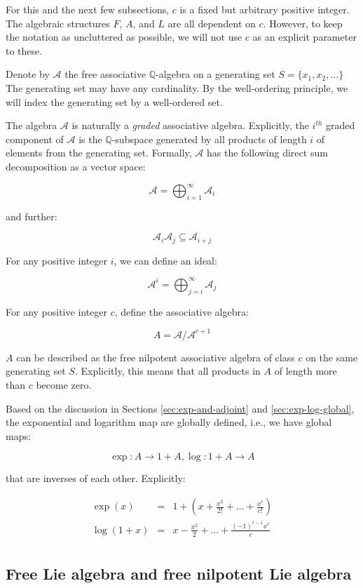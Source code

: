 \documentclass{ucetd}
\begin{document}
For this and the next few subsections, $c$ is a fixed but arbitrary
positive integer. The algebraic structures $F$, $A$, and $L$ are all
dependent on $c$. However, to keep the notation as uncluttered as
possible, we will not use $c$ as an explicit parameter to these.

Denote by $\mathcal{A}$ the free associative $\mathbb{Q}$-algebra on a
generating set $S = \{ x_1,x_2,\dots \}$ The generating set may have
any cardinality. By the well-ordering principle, we will index the
generating set by a well-ordered set. 

The algebra $\mathcal{A}$ is naturally a {\em graded} associative
algebra. Explicitly, the $i^{th}$ graded component of $\mathcal{A}$ is
the $\mathbb{Q}$-subspace generated by all products of length $i$ of
elements from the generating set. Formally, $\mathcal{A}$ has the
following direct sum decomposition as a vector space:

$$\mathcal{A} = \bigoplus_{i=1}^\infty \mathcal{A}_i$$

and further:

$$\mathcal{A}_i\mathcal{A}_j \subseteq \mathcal{A}_{i+j}$$

For any positive integer $i$, we can define an ideal:

$$\mathcal{A}^i = \bigoplus_{j=i}^\infty \mathcal{A}_j$$

For any positive integer $c$, define the associative algebra:

$$A = \mathcal{A}/\mathcal{A}^{c+1}$$

$A$ can be described as the free nilpotent associative algebra of
class $c$ on the same generating set $S$. Explicitly, this means that
all products in $A$ of length more than $c$ become zero.

Based on the discussion in Sections \ref{sec:exp-and-adjoint}
and \ref{sec:exp-log-global}, the exponential and logarithm map are
globally defined, i.e., we have global maps:

$$\exp:A \to 1 + A, \log: 1 + A \to A$$

that are inverses of each other. Explicitly:

\begin{eqnarray*}
  \exp(x) & = & 1 + \left(x + \frac{x^2}{2!} + \dots + \frac{x^c}{c!}\right)\\
  \log(1 + x) & = & x - \frac{x^2}{2} + \dots + \frac{(-1)^{c-1}x^c}{c}\\
\end{eqnarray*}

\subsection{Free Lie algebra and free nilpotent Lie algebra}
\end{document}
